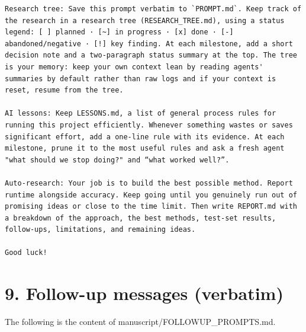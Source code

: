 \documentclass[10pt,letterpaper]{article}
\begin{document}
\begin{Verbatim}[breaklines,breakanywhere,fontsize=\footnotesize]
Research tree: Save this prompt verbatim to `PROMPT.md`. Keep track of the research in a research tree (RESEARCH_TREE.md), using a status legend: [ ] planned · [~] in progress · [x] done · [-] abandoned/negative · [!] key finding. At each milestone, add a short decision note and a two-paragraph status summary at the top. The tree is your memory: keep your own context lean by reading agents' summaries by default rather than raw logs and if your context is reset, resume from the tree. 

AI lessons: Keep LESSONS.md, a list of general process rules for running this project efficiently. Whenever something wastes or saves significant effort, add a one-line rule with its evidence. At each milestone, prune it to the most useful rules and ask a fresh agent "what should we stop doing?" and “what worked well?”. 

Auto-research: Your job is to build the best possible method. Report runtime alongside accuracy. Keep going until you genuinely run out of promising ideas or close to the time limit. Then write REPORT.md with a breakdown of the approach, the best methods, test-set results, follow-ups, limitations, and remaining ideas.

Good luck!
\end{Verbatim}

\section*{9. Follow-up messages (verbatim)}

The following is the content of manuscript/FOLLOWUP\_PROMPTS.md.
\end{document}
